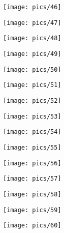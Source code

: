 \documentclass[a4paper,10pt]{article}
\begin{document}
\begin{center}
    \texttt{[image: pics/46]}
\vspace{1em}



    \texttt{[image: pics/47]}
\vspace{1em}



    \texttt{[image: pics/48]}
\vspace{1em}



    \texttt{[image: pics/49]}
\vspace{1em}



    \texttt{[image: pics/50]}
\vspace{1em}



    \texttt{[image: pics/51]}
\vspace{1em}



    \texttt{[image: pics/52]}
\vspace{1em}



    \texttt{[image: pics/53]}
\vspace{1em}



    \texttt{[image: pics/54]}
\vspace{1em}



    \texttt{[image: pics/55]}
\vspace{1em}



    \texttt{[image: pics/56]}
\vspace{1em}



    \texttt{[image: pics/57]}
\vspace{1em}



    \texttt{[image: pics/58]}
\vspace{1em}



    \texttt{[image: pics/59]}
\vspace{1em}



    \texttt{[image: pics/60]}
\vspace{1em}





\end{center}
\end{document}
